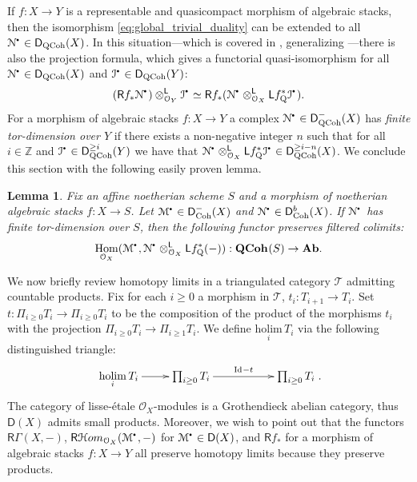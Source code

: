 \documentclass{amsart}
\theoremstyle{plain}
\newtheorem{lem}[thm]{Lemma}
\theoremstyle{definition}
\theoremstyle{remark}
\numberwithin{equation}{section}
\newcommand{\Z}{\mathbb{Z}}
\newcommand{\Orb}{\mathcal{O}}
\newcommand{\QCOHB}{\mathbf{QCoh}}
\newcommand{\QCOH}[2][]{\QCOHB^{#1}({#2})}
\DeclareMathOperator{\Hom}{Hom}
\newcommand{\RDERF}{\mathsf{R}}
\newcommand{\LDERF}{\mathsf{L}}
\newcommand{\DCAT}{\mathsf{D}}
\newcommand{\SHom}{\mathcal{H}om}
\newcommand{\SRHom}{\RDERF\SHom}
\newcommand{\ID}[1]{\mathrm{Id}_{#1}}
\newcommand{\tensor}{\otimes}
\newcommand{\homotopic}{\simeq}
\newcommand{\AB}{\mathbf{Ab}}
\newcommand{\shv}[1]{\mathcal{{#1}}}
\newcommand{\fndefn}[1]{\emph{{#1}}}
\newcommand{\holim}[1]{\underset{#1}{\mathrm{holim}}\,}
\newcommand{\QCPSH}[1]{{#1}_{*}}
\newcommand{\QCPBK}[1]{{#1}_{\mathrm{Q}}^*}
\newcommand{\DQCOH}{\DCAT_{\mathrm{QCoh}}}
\newcommand{\DCOH}{\DCAT_{\mathrm{Coh}}}
\newcommand{\sbt}{\,\begin{picture}(-1,-1)(0,-2)\circle*{1.5}\end{picture}\ }
\newcommand{\cplx}[1]{\shv{{#1}}^{\sbt}}
\begin{document}
If $f : X \to Y$ is a representable and quasicompact morphism of
algebraic stacks, then the isomorphism
\eqref{eq:global_trivial_duality} can be extended to all $\cplx{N} \in
\DQCOH(X)$. In this situation---which is covered in 
\cite{perfect_complexes_stacks}, generalizing
\cite[Prop.~5.3]{MR1308405}---there is also the projection formula, 
which gives a functorial quasi-isomorphism for all $\cplx{N} \in \DQCOH(X)$
and $\cplx{I} \in \DQCOH(Y)$:
\begin{equation}
  \label{eq:projection_formula}
  (\RDERF \QCPSH{f}\cplx{N})\tensor^{\LDERF}_{\Orb_Y} \cplx{I}\homotopic
  \RDERF \QCPSH{f}(\cplx{N} \tensor^{\LDERF}_{\Orb_X} \LDERF\QCPBK{f}\cplx{I}).
\end{equation}
For a
morphism of algebraic stacks $f : X \to Y$ a complex $\cplx{N} \in
\DQCOH^-(X)$ has \fndefn{finite tor-dimension over $Y$} if there
exists a non-negative integer $n$ such that for all $i\in \Z$ and $\cplx{I} \in \DQCOH^{\geq
  i}(Y)$ we have that $\cplx{N}\tensor_{\Orb_X}^\LDERF \LDERF
\QCPBK{f}\cplx{I} \in \DQCOH^{\geq i-n}(X)$. We conclude this section with
the following easily proven lemma.
\begin{lem}\label{lem:lp_stk_hom}
  Fix an affine noetherian scheme $S$ and a morphism of noetherian
  algebraic stacks $f : X \to S$. Let
  $\cplx{M} \in  
  \DCOH^-(X)$ and $\cplx{N} \in
  \DCOH^b(X)$. If $\cplx{N}$ has finite tor-dimension over $S$, 
  then the following functor preserves filtered colimits:
  \[
  \Hom_{\Orb_X}(\cplx{M},\cplx{N}
  \tensor_{\Orb_X}^{\LDERF } \LDERF \QCPBK{f}(-)) : \QCOH{S} \to \AB.
  \]
\end{lem}
We now briefly review homotopy limits in a triangulated category
$\mathcal{T}$ admitting countable products. Fix for each $i\geq 0$ a
morphism in $\mathcal{T}$, $t_i : T_{i+1} \to 
T_i$. Set $t : \Pi_{i\geq 0} T_i \to \Pi_{i\geq 0} T_i$ to be
the composition of the product of the morphisms $t_i$ with the
projection $\Pi_{i\geq 0} T_i \to \Pi_{i\geq 1} T_i$. We define
$\holim{i} T_i$ via the following distinguished triangle:
\[
\xymatrix{\holim{i} T_i \ar[r] & \prod_{i\geq 0} T_i
  \ar[rr]^{\ID{}-t} & & \prod_{i\geq 0} T_i}.
\]
The category of lisse-\'etale $\Orb_X$-modules is a Grothendieck
abelian category, thus $\DCAT(X)$ admits small products. Moreover, we wish to 
point out that the functors $\RDERF \Gamma(X,-)$,
$\SRHom_{\Orb_X}(\cplx{M},-)$ for $\cplx{M} \in \DCAT(X)$, and $\RDERF
f_*$ for a morphism of algebraic stacks $f :X \to Y$ all preserve 
homotopy limits because they preserve products. 
\end{document}
